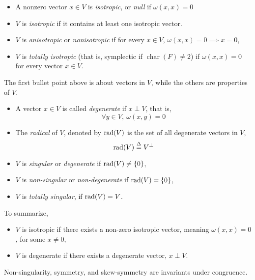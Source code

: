 \documentclass[../main-manifolds.tex]{subfiles}
\begin{document}
    \begin{definition}
        \begin{itemize}
            \item A nonzero vector $x\in V$ is \emph{isotropic}, or \emph{null} if $\omega(x,x)=0$
            \item $V$ is \emph{isotropic} if it contains at least one isotropic vector.
            \item $V$ is \emph{anisotropic} or \emph{nonisotropic} if for every $x\in V$, $\omega(x,x)=0\implies x=0$,
            \item $V$ is \emph{totally isotropic} (that is, symplectic if $\operatorname{char}(F)\neq 2$) if $\omega(x,x)=0$ for every vector $x\in V$. 
        \end{itemize}
        
            The first bullet point above is about vectors in $V$, while the others are properties of $V$.
        \begin{itemize}
            \item A vector $x\in V$ is called \emph{degenerate} if $x\perp V$, that is, 
            \[
                \forall y\in V,\: \omega(x,y)=0
            \]
            \item The \emph{radical} of $V$, denoted by $\operatorname{rad}({V})$ is the set of all degenerate vectors in $V$,
            \[
                \operatorname{rad}({V})\overset{\Delta}{=} V^\perp  
            \]
            \item $V$ is \emph{singular} or \emph{degenerate} if $\operatorname{rad}({V})\neq \{0\}$,
            \item $V$ is \emph{non-singular} or \emph{non-degenerate} if $\operatorname{rad}({V}) = \{0\}$,
            \item $V$ is \emph{totally singular}, if $\operatorname{rad}({V}) = V$. 
        \end{itemize}
        To summarize,
        \begin{itemize}
            \item $V$ is isotropic if there exists a non-zero isotropic vector, meaning $\omega(x,x)=0$, for some $x\neq 0$,
            \item $V$ is degenerate if there exists a degenerate vector, $x\perp V$.
        \end{itemize}
    \end{definition}
    \begin{wts}\label{matrix-invariants-under-congruence}
        Non-singularity, symmetry, and skew-symmetry are invariants under congruence.
    \end{wts}
\end{document}
